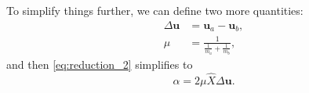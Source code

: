 \documentclass{article}
\renewcommand{\vec}[1]{\bm{#1}}
\begin{document}
\begin{enumerate}
        To simplify things further, we can define two more quantities:
        \begin{align}
            \Delta \vec{u} &= \vec{u}_{a}-\vec{u}_{b},\\
            \mu &= \frac{1}{\frac{1}{m_{a}}+\frac{1}{m_{b}}},
            \label{eq:simplifications_1}
        \end{align}
        and then \autoref{eq:reduction_2} simplifies to
        \begin{equation}
            \alpha = 2\mu\hat{X}\Delta\vec{u}.
            \label{eq:simplifications_2}
        \end{equation}
\end{enumerate}
\end{document}
